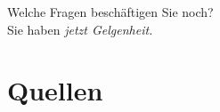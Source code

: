 \documentclass[aspectratio=169, xcolor=dvipsnames]{beamer}
\begin{document}
\begin{frame}[plain]
    \begin{center}
        \Huge{Welche Fragen beschäftigen Sie noch?}\\
        \Large{Sie haben \em{jetzt} Gelgenheit.}
    \end{center}
\end{frame}

\section{Quellen}
\begin{frame}[allowframebreaks]{\secname}
    \nocite{*}
    \printbibliography
\end{frame}
\end{document}
